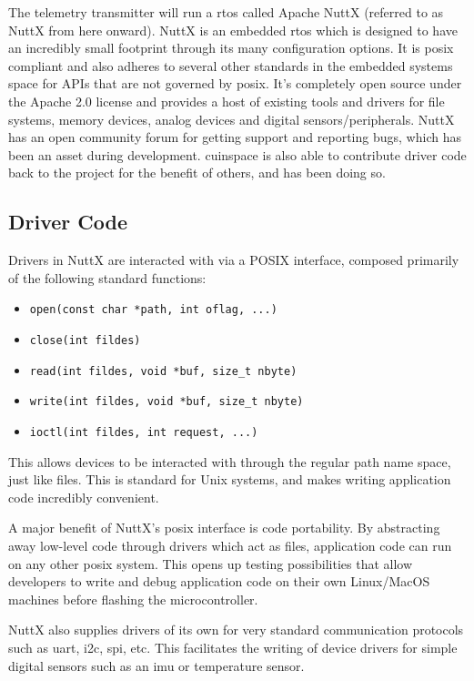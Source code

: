 The telemetry transmitter will run a \gls{rtos} called Apache NuttX (referred to as NuttX from here onward). NuttX is
an embedded \gls{rtos} which is designed to have an incredibly small footprint through its many configuration options.
\cite{nuttx-about} It is \gls{posix} compliant and also adheres to several other standards in the embedded systems
space for APIs that are not governed by \gls{posix}. \cite{nuttx-about} It's completely open source under the Apache
2.0 license and provides a host of existing tools and drivers for file systems, memory devices, analog devices and
digital sensors/peripherals. NuttX has an open community forum for getting support and reporting bugs, which has been
an asset during development. \Gls{cuinspace} is also able to contribute driver code back to the project for the benefit
of others, and has been doing so.

\subsection{Driver Code}

Drivers in NuttX are interacted with via a POSIX interface, composed primarily of the following standard functions:

\begin{itemize}
    \item \texttt{open(const char *path, int oflag, ...)}
    \item \texttt{close(int fildes)}
    \item \texttt{read(int fildes, void *buf, size\_t nbyte)}
    \item \texttt{write(int fildes, void *buf, size\_t nbyte)}
    \item \texttt{ioctl(int fildes, int request, ...)}
\end{itemize}

This allows devices to be interacted with through the regular path name space, just like files. This is standard for
Unix systems, and makes writing application code incredibly convenient.

A major benefit of NuttX's \gls{posix} interface is code portability. By abstracting away low-level code through
drivers which act as files, application code can run on any other \gls{posix} system. This opens up testing
possibilities that allow developers to write and debug application code on their own Linux/MacOS machines before
flashing the microcontroller.

NuttX also supplies drivers of its own for very standard communication protocols such as \gls{uart}, \gls{i2c},
\gls{spi}, etc. This facilitates the writing of device drivers for simple digital sensors such as an \gls{imu} or
temperature sensor.


